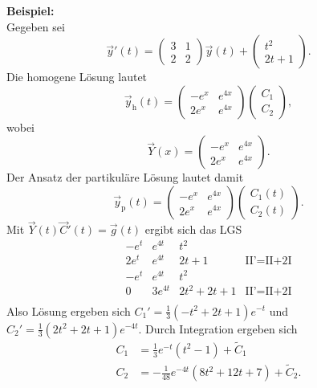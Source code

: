 \noindent
\textbf{Beispiel:}\\
Gegeben sei
$$
\vec y'(t) = \begin{pmatrix} 3 & 1 \\ 2 & 2 \end{pmatrix} \vec y(t) + \begin{pmatrix} t^2 \\ 2t+1 \end{pmatrix}.
$$
Die homogene L\"osung lautet 
$$
\vec y_{\text{h}}(t) = \begin{pmatrix}-e^x & e^{4x} \\ 2e^x & e^{4x} \end{pmatrix} \begin{pmatrix}C_1 \\ C_2 \end{pmatrix},
$$
wobei 
$$
\vec Y(x) = \begin{pmatrix}-e^x & e^{4x} \\ 2e^x & e^{4x} \end{pmatrix}.
$$
Der Ansatz der partikul\"are L\"osung lautet damit
$$
\vec y_{\text{p}}(t) = \begin{pmatrix}-e^x & e^{4x} \\ 2e^x & e^{4x} \end{pmatrix} \begin{pmatrix} C_1(t) \\ C_2(t) \end{pmatrix} .
$$
Mit $ \vec Y(t) \vec C'(t) = \vec g(t)$ ergibt sich das LGS
$$
\begin{array}{rr|l|l}
-e^t & e^{4t} & t^2 &  \\
2e^t & e^{4t} & 2t+1 & \text{II'=II+2I} \\ \hline
-e^t & e^{4t} & t^2 &  \\
0 & 3e^{4t} & 2t^2+2t+1 & \text{II'=II+2I} \\ 
\end{array}
$$
Also L\"osung ergeben sich $C_1'= \frac{1}{3}(-t^2+2t+1)e^{-t}$ und $C_2'= \frac{1}{3}(2t^2+2t+1)e^{-4t}$. Durch Integration ergeben sich
\begin{align*}
C_1 &= \frac{1}{3}e^{-t}(t^2-1) + \tilde{C}_1\\
C_2 &= -\frac{1}{48} e^{-4t}(8t^2+12t+7) +\tilde{C}_2.
\end{align*} 

